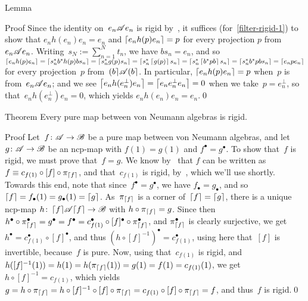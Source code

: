 \documentclass[a]{subfiles}
\begin{document}
\begin{parsec}
\begin{point}{Lemma}
\begin{point}{Proof}
Since the identity on~$e_n \mathscr{A} e_n$ is rigid
by~,
it suffices (for~\eqref{filter-rigid-1})
to show that 
$e_n h(e_n) e_n = e_n$
and 
$\left\lceil e_nh(p)e_n\right\rceil = p$
for every projection $p$ from $e_n\mathscr{A} e_n$.
Writing~$s_N:=\sum_{n=1}^N t_n$,
we have $bs_n = e_n$,
and so
$
\left\lceil e_n h(p) e_n\right\rceil
=
\left\lceil s_n^* b^* h(p) b s_n\right\rceil
=
\left\lceil s_n^*g(p) s_n\right\rceil
=
\left\lceil s_n^* \left\lceil g(p)\right\rceil s_n\right\rceil
=
\left\lceil s_n^* \left\lceil b^* p b\right\rceil s_n\right\rceil
=
\left\lceil s_n^* b^* p b s_n\right\rceil
=
\left\lceil e_n p e_n \right\rceil
$
for every 
projection~$p$ from~$\left(b\right\rceil\!\mathscr{A}\!\left(b\right\rceil$.
In particular, $\left\lceil e_n h(p)e_n\right\rceil = p$
when~$p$ is from~$e_n \mathscr{A} e_n$;
and we see $\left\lceil e_n h(e_n^\perp) e_n\right\rceil=\left\lceil e_n e_n^\perp e_n\right\rceil=0$
when we take~$p=e_n^\perp$,
so that~$e_n h(e_n^\perp) e_n =0$,
which yields $e_nh(e_n)e_n = e_n$.\qed
\end{point}
\end{point}
\begin{point}{Theorem}%
Every pure map between von Neumann algebras is rigid.
\begin{point}{Proof}%
Let~$f\colon \mathscr{A}\to\mathscr{B}$ be a pure map between von Neumann algebras,
and let~$g\colon \mathscr{A}\to\mathscr{B}$ be an ncp-map
with $f(1)=g(1)$
and $f^\bullet = g^\bullet$.
To show that~$f$
is rigid,
we must prove that~$f=g$.
We know by~
that $f$ can be written as $f\equiv c_{f(1)} \circ [f]\circ \pi_{\left\lceil f\right\rceil}$,
and that~$c_{f(1)}$ is rigid,
by~,
which we'll use shortly.
Towards this end,
note that since~$f^\bullet = g^\bullet$,
we have $f_\bullet = g_\bullet$,
and so $\left\lceil f\right\rceil=f_\bullet(1)=g_\bullet(1)=\left\lceil g\right\rceil$.
As~$\pi_{\left\lceil f\right\rceil}$ is a corner of~$\left\lceil f\right\rceil=\left\lceil g\right\rceil$,
there is a unique ncp-map $h\colon \left\lceil f\right\rceil\!\mathscr{A}\!\left\lceil f\right\rceil\to\mathscr{B}$
with $h\circ \pi_{\left\lceil f\right\rceil} =g$. 
Since then
$h^\bullet \circ \pi_{\left\lceil f\right\rceil}^\bullet
= g^\bullet = f^\bullet 
= c_{f(1)}^\bullet
\circ [f]^\bullet \circ \pi_{\left\lceil f\right\rceil}^\bullet$,
 and $\pi_{\left\lceil f\right\rceil}^\bullet$ is clearly surjective,
we get~$h^\bullet = c_{f(1)}^\bullet\circ [f]^\bullet$,
and thus  $(h\circ [f]^{-1})^\bullet = c_{f(1)}^\bullet$,
using here that~$[f]$ is invertible,
because~$f$ is pure.
Now,
using that~$c_{f(1)}$
is rigid,
and $h([f]^{-1}(1))=h(1)=h(\pi_{\left\lceil f\right\rceil}(1))=g(1)=f(1)=c_{f(1)}(1)$,
we get~$h\circ [f]^{-1}=c_{f(1)}$,
which yields
$g=h\circ \pi_{\left\lceil f\right\rceil} 
=h\circ [f]^{-1}\circ [f]\circ \pi_{\left\lceil f\right\rceil}
= c_{f(1)} \circ [f] \circ \pi_{\left\lceil f\right\rceil} = f$,
and thus~$f$ is rigid.\qed
\end{point}
\end{point}
\end{parsec}
\end{document}
